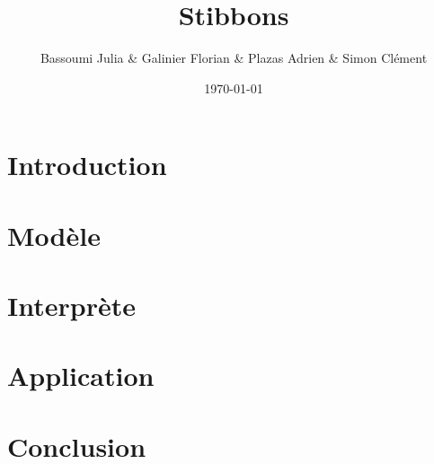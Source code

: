 \documentclass[11pt,handout]{beamer}
\title{Stibbons}
\author{Bassoumi Julia \& Galinier Florian \& Plazas Adrien \& Simon Clément}
\date{\today}
\begin{document}
\begin{frame}
\titlepage
\end{frame}

\begin{frame}
\tableofcontents
\end{frame}

\section{Introduction}


\section{Modèle}


\section{Interprète}


\section{Application}


\section{Conclusion}

\end{document}
